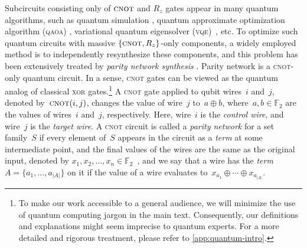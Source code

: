 \documentclass[a4paper,cleveref, autoref, 11pt, fleqn, thm-restate]{article}
\theoremstyle{plain}
\renewcommand{\ket}[1]{\{#1\}}
\newcommand{\rowadd}[1]{\textsc{cnot}(#1)}
\begin{document}
{%
Subcircuits consisting only of $\textsc{cnot}$ and $R_z$ gates appear in many quantum algorithms, such as quantum simulation \cite{namAutomatedOptimizationLarge2018}, quantum approximate optimization algorithm (\textsc{qaoa}) \cite{farhiQuantumApproximateOptimization2014a}, variational quantum eigensolver (\textsc{vqe})~\cite{peruzzo2014VQE}, etc. To optimize such quantum circuits with massive $\{\textsc{cnot}, R_z\}$-only components, a widely employed method is to independently resynthesize these components, and this problem has been extensively treated by \textit{parity network synthesis} \cite{amyControlledNOTComplexityControlledNOT2018,gheorghiuReducingCNOTCount2023}.
Parity network is a \textsc{cnot}-only quantum circuit. In a sense, \textsc{cnot} gates can be viewed as the quantum analog of classical \textsc{xor} gates.\footnote{To make our work accessible to a general audience, we will minimize the use of quantum computing jargon in the main text.  Consequently, our definitions and explanations might seem imprecise to quantum experts.  For a more detailed and rigorous treatment, please refer to \cref{app:quantum-intro}.}
A \textsc{cnot} gate applied to qubit wires~$i$ and~$j$, denoted by~$\rowadd{i,j}$, changes the value of wire~$j$ to~$a\oplus b$, where~$a,b\in \mathbb{F}_2$ are the values of wires~$i$ and~$j$, respectively. Here, wire~$i$ is the \textit{control wire}, and wire~$j$ is the \textit{target wire}.
A \textsc{cnot} circuit is called a \emph{parity network} for a set family~$S$ if every element of~$S$ appears in the circuit as a \textit{term} at some intermediate point, and the final values of the wires are the same as the original input, denoted by ${x_1,x_2,\dots,x_n \in \mathbb{F}_2}$~\cite{amyControlledNOTComplexityControlledNOT2018}, and we say that a wire has the \textit{term}~$A = \ket{a_{1}, \ldots, a_{|A|}}$ on it if the value of a wire evaluates to~$x_{a_{1}}\oplus \cdots \oplus x_{a_{|A|}}$.

}
\end{document}
